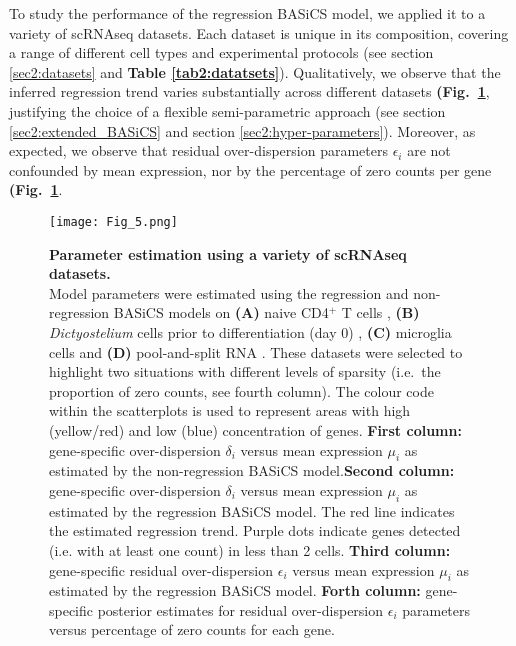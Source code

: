 To study the performance of the regression BASiCS model, we applied it to a variety of scRNAseq datasets. Each dataset is unique in its composition, covering a range of different cell types and experimental protocols (see section \ref{sec2:datasets} and \textbf{Table \ref{tab2:datatsets}}). Qualitatively, we observe that the inferred regression trend varies substantially across different datasets \textbf{(Fig.~\ref{fig2:datasets}}, justifying the choice of a flexible semi-parametric approach (see section \ref{sec2:extended_BASiCS} and section \ref{sec2:hyper-parameters}). Moreover, as expected, we observe that residual over-dispersion parameters $\epsilon_i$ are not confounded by mean expression, nor by the percentage of zero counts per gene \textbf{(Fig.~\ref{fig2:datasets}}. \\

\newpage

\begin{figure}[!h]
\centering
\texttt{[image: Fig\_5.png]}
\caption[Parameter estimation using a variety of scRNAseq datasets]{\textbf{Parameter estimation using a variety of scRNAseq datasets.}\\
Model parameters were estimated using the regression and non-regression BASiCS models on \textbf{(A)} naive CD4$^+$ T cells \citep{Martinez-jimenez2017}, \textbf{(B)} \textit{Dictyostelium} cells prior to differentiation (day 0) \citep{Antolovic2017}, \textbf{(C)} microglia cells \citep{Zeisel2015} and \textbf{(D)} pool-and-split RNA \citep{Grun2014}. These datasets were selected to highlight two situations with different levels of sparsity (i.e.~the proportion of zero counts, see fourth column). The colour code within the scatterplots is used to represent areas with high (yellow/red) and low (blue) concentration of genes. \textbf{First column:} gene-specific over-dispersion $\delta_i$ versus mean expression $\mu_i$ as estimated by the non-regression BASiCS model.\textbf{Second column:} gene-specific over-dispersion $\delta_i$ versus mean expression $\mu_i$ as estimated by the regression BASiCS model. The red line indicates the estimated regression trend. Purple dots indicate genes detected (i.e. with at least one count) in less than 2 cells. \textbf{Third column:} gene-specific residual over-dispersion $\epsilon_i$ versus mean expression $\mu_i$ as estimated by the regression BASiCS model. \textbf{Forth column:} gene-specific posterior estimates for residual over-dispersion $\epsilon_i$ parameters versus percentage of zero counts for each gene.\\}
\label{fig2:datasets}
\end{figure}

